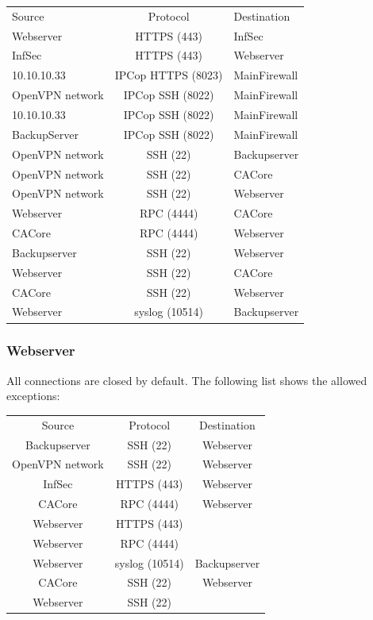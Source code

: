 \documentclass[a4paper, toc=index, 12pt, DIV14, twoside, BCOR2cm, headsepline, numbers=noenddot, bibliography=totoc]{scrbook}
\begin{document}
\begin{tabular}{l c l}
Source & Protocol & Destination \\
\cline{1-3}
Webserver & HTTPS (443) & InfSec \\
\cline{1-3}
InfSec & HTTPS (443) & Webserver \\
\cline{1-3}
10.10.10.33 & IPCop HTTPS (8023) & MainFirewall\\
\cline{1-3}
OpenVPN network & IPCop SSH (8022) & MainFirewall \\
\cline{1-3}
10.10.10.33 & IPCop SSH (8022) & MainFirewall \\
\cline{1-3}
BackupServer & IPCop SSH (8022) & MainFirewall \\
\cline{1-3}
OpenVPN network & SSH (22) & Backupserver \\
\cline{1-3}
OpenVPN network & SSH (22) & CACore \\
\cline{1-3}
OpenVPN network & SSH (22) & Webserver \\
\cline{1-3}
Webserver & RPC (4444) & CACore \\
\cline{1-3}
CACore & RPC (4444) & Webserver \\
\cline{1-3}
Backupserver & SSH (22) & Webserver \\
\cline{1-3}
Webserver & SSH (22) & CACore \\
\cline{1-3}
CACore & SSH (22) & Webserver \\
\cline{1-3}
Webserver & syslog (10514) & Backupserver \\
\end{tabular}

\subsubsection{Webserver}
All connections are closed by default. The following list shows the allowed exceptions:\newline


\begin{tabular}{c c c}
Source & Protocol & Destination \\
\cline{1-3}
Backupserver & SSH (22) & Webserver \\
\cline{1-3}
OpenVPN network & SSH (22) & Webserver \\
\cline{1-3}
InfSec & HTTPS (443) & Webserver \\
\cline{1-3}
CACore & RPC (4444) & Webserver \\
\cline{1-3}
Webserver & HTTPS (443) &  \\
\cline{1-3}
Webserver & RPC (4444) &  \\
\cline{1-3}
Webserver & syslog (10514) & Backupserver \\
\cline{1-3}
CACore & SSH (22) & Webserver \\
\cline{1-3}
Webserver & SSH (22) &  \\
\end{tabular}
\end{document}
